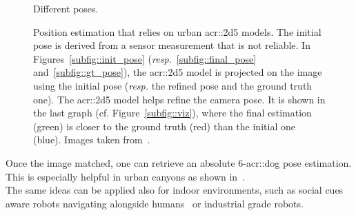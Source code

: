 \begin{figure}[htpb]
{\begin{subfloatrow}[5]
{                        }{
                            \caption{\label{subfig::viz} Different poses.}
                        }
                    \end{subfloatrow}
                }
                {
                    \caption[
                        Position estimation that relies on urban \gls{acr::2d5} models.
                    ]{
                        \label{fig::navigation}
                        Position estimation that relies on urban \gls{acr::2d5} models.
                        The initial pose is derived from a sensor measurement that is not reliable.
                        In Figures~\ref{subfig::init_pose} (\textit{resp.}~\ref{subfig::final_pose} and~\ref{subfig::gt_pose}), the \gls{acr::2d5} model is projected on the image using the initial pose (\textit{resp.} the refined pose and the ground truth one).
                        The \gls{acr::2d5} model helps refine the camera pose.
                        It is shown in the last graph (cf. Figure~\ref{subfig::viz}), where the final estimation (green) is closer to the ground truth (red) than the initial one (blue).
                        Images taken from~\parencite{armagan2017semantic}.
                    }
                }
            \end{figure}

            Once the image matched, one can retrieve an absolute 6-\gls{acr::dog} pose estimation.
            This is especially helpful in urban canyons as shown in~\parencite{piasco2018survey}.\\
            The same ideas can be applied also for indoor environments, such as social cues aware robots navigating alongside humans~\parencite{gupta2018social} or industrial grade robots\addref.
       
